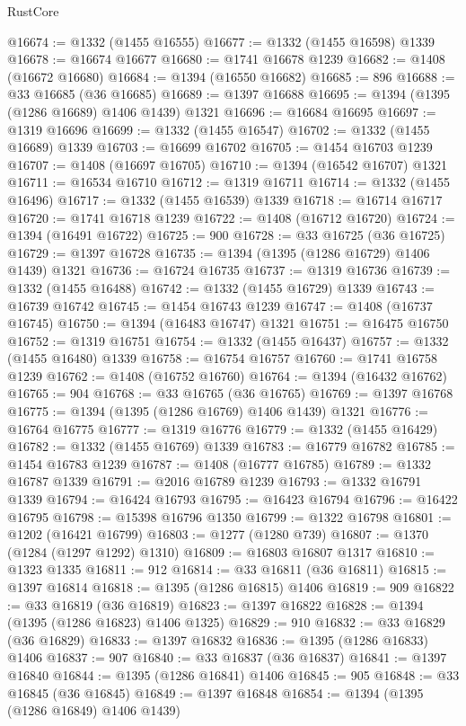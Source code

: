 \begin{lexlean}{RustCore}
\begin{coremodule}
@16674 := @1332 (@1455 @16555)
@16677 := @1332 (@1455 @16598) @1339
@16678 := @16674 @16677
@16680 := @1741 @16678 @1239
@16682 := @1408 (@16672 @16680)
@16684 := @1394 (@16550 @16682)
@16685 := 896
@16688 := @33 @16685 (@36 @16685)
@16689 := @1397 @16688
@16695 := @1394 (@1395 (@1286 @16689) @1406 @1439) @1321
@16696 := @16684 @16695
@16697 := @1319 @16696
@16699 := @1332 (@1455 @16547)
@16702 := @1332 (@1455 @16689) @1339
@16703 := @16699 @16702
@16705 := @1454 @16703 @1239
@16707 := @1408 (@16697 @16705)
@16710 := @1394 (@16542 @16707) @1321
@16711 := @16534 @16710
@16712 := @1319 @16711
@16714 := @1332 (@1455 @16496)
@16717 := @1332 (@1455 @16539) @1339
@16718 := @16714 @16717
@16720 := @1741 @16718 @1239
@16722 := @1408 (@16712 @16720)
@16724 := @1394 (@16491 @16722)
@16725 := 900
@16728 := @33 @16725 (@36 @16725)
@16729 := @1397 @16728
@16735 := @1394 (@1395 (@1286 @16729) @1406 @1439) @1321
@16736 := @16724 @16735
@16737 := @1319 @16736
@16739 := @1332 (@1455 @16488)
@16742 := @1332 (@1455 @16729) @1339
@16743 := @16739 @16742
@16745 := @1454 @16743 @1239
@16747 := @1408 (@16737 @16745)
@16750 := @1394 (@16483 @16747) @1321
@16751 := @16475 @16750
@16752 := @1319 @16751
@16754 := @1332 (@1455 @16437)
@16757 := @1332 (@1455 @16480) @1339
@16758 := @16754 @16757
@16760 := @1741 @16758 @1239
@16762 := @1408 (@16752 @16760)
@16764 := @1394 (@16432 @16762)
@16765 := 904
@16768 := @33 @16765 (@36 @16765)
@16769 := @1397 @16768
@16775 := @1394 (@1395 (@1286 @16769) @1406 @1439) @1321
@16776 := @16764 @16775
@16777 := @1319 @16776
@16779 := @1332 (@1455 @16429)
@16782 := @1332 (@1455 @16769) @1339
@16783 := @16779 @16782
@16785 := @1454 @16783 @1239
@16787 := @1408 (@16777 @16785)
@16789 := @1332 @16787 @1339
@16791 := @2016 @16789 @1239
@16793 := @1332 @16791 @1339
@16794 := @16424 @16793
@16795 := @16423 @16794
@16796 := @16422 @16795
@16798 := @15398 @16796 @1350
@16799 := @1322 @16798
@16801 := @1202 (@16421 @16799)
@16803 := @1277 (@1280 @739)
@16807 := @1370 (@1284 (@1297 @1292) @1310)
@16809 := @16803 @16807 @1317
@16810 := @1323 @1335
@16811 := 912
@16814 := @33 @16811 (@36 @16811)
@16815 := @1397 @16814
@16818 := @1395 (@1286 @16815) @1406
@16819 := 909
@16822 := @33 @16819 (@36 @16819)
@16823 := @1397 @16822
@16828 := @1394 (@1395 (@1286 @16823) @1406 @1325)
@16829 := 910
@16832 := @33 @16829 (@36 @16829)
@16833 := @1397 @16832
@16836 := @1395 (@1286 @16833) @1406
@16837 := 907
@16840 := @33 @16837 (@36 @16837)
@16841 := @1397 @16840
@16844 := @1395 (@1286 @16841) @1406
@16845 := 905
@16848 := @33 @16845 (@36 @16845)
@16849 := @1397 @16848
@16854 := @1394 (@1395 (@1286 @16849) @1406 @1439)

\end{coremodule}
\end{lexlean}
